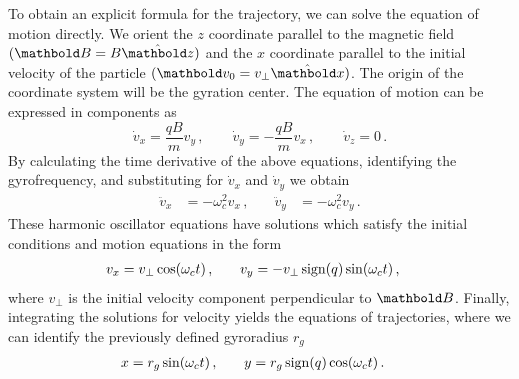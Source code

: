 To obtain an explicit formula for the trajectory, we can solve the
equation of motion directly. We orient the $z$ coordinate parallel
to the magnetic field $(\mb B=B\hat{\mb z})$ and the $x$ coordinate parallel
to the initial velocity of the particle $(\mb v_0 = v_\perp\hat{\mb x})$.
The origin of the coordinate system
will be the gyration center.
The equation of motion can be expressed in components as
\begin{equation}
    \dot v_x = \frac{qB}{m}v_y\,,\qquad
    \dot v_y = -\frac{qB}{m}v_x\,,\qquad
    \dot v_z = 0\,.
\end{equation}
By calculating the time derivative of the above equations,
identifying the gyrofrequency, and substituting
for $\dot v_x$ and $\dot v_y$ we obtain
\begin{align}
    \ddot v_x &= -\omega_c^2 v_x\,,\quad
              &\ddot v_y &= -\omega_c^2 v_y\,.
\end{align}
These harmonic oscillator equations have solutions which satisfy the initial
conditions and motion equations in the form
\begin{align}
    v_x &= v_\perp\cos(\omega_c t)\,,\quad
        &v_y &= -v_\perp\operatorname{sign}(q)\sin(\omega_c t)\,,
    \label{eq:part:gyrationv}
\end{align}
where $v_\perp$ is the
initial velocity component perpendicular to $\mb B$. Finally, integrating
the solutions for velocity yields the equations of trajectories, where we
can identify the previously defined gyroradius $r_g$
\begin{align}
    x &= r_g\sin(\omega_c t)\,,\quad
      &y &= r_g\operatorname{sign}(q)\cos(\omega_c t)\,.
    \label{eq:part:gyrationx}
\end{align}

